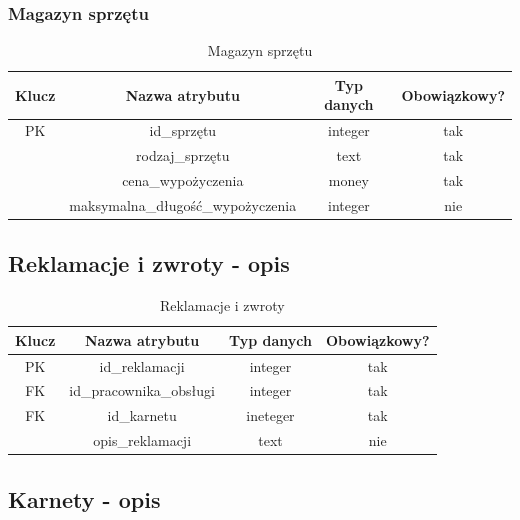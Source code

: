 \documentclass{sprawozdanie-agh}
\begin{document}
\subsubsection{Magazyn sprzętu}
\begin{table}[H]
	\centering
	\begin{tabular}{|c|c|c|c|}
		\hline
		Klucz & Nazwa atrybutu                        & Typ danych & Obowiązkowy? \\ \hline
		PK    & id\_sprzętu                          & integer    & tak           \\ \hline
		      & rodzaj\_sprzętu                      & text       & tak           \\ \hline
		      & cena\_wypożyczenia                   & money      & tak           \\ \hline
		      & maksymalna\_długość\_wypożyczenia & integer    & nie           \\ \hline
	\end{tabular}
	\caption{Magazyn sprzętu}
\end{table}

\subsection{Reklamacje i zwroty - opis}
\begin{table}[H]
	\centering
	\begin{tabular}{|c|c|c|c|}
		\hline
		Klucz & Nazwa atrybutu           & Typ danych & Obowiązkowy? \\ \hline
		PK    & id\_reklamacji           & integer    & tak           \\ \hline
		FK    & id\_pracownika\_obsługi & integer    & tak           \\ \hline
		FK    & id\_karnetu              & ineteger   & tak           \\ \hline
		      & opis\_reklamacji         & text       & nie           \\ \hline
	\end{tabular}
	\caption{Reklamacje i zwroty}
\end{table}

\subsection{Karnety - opis}
\end{document}
